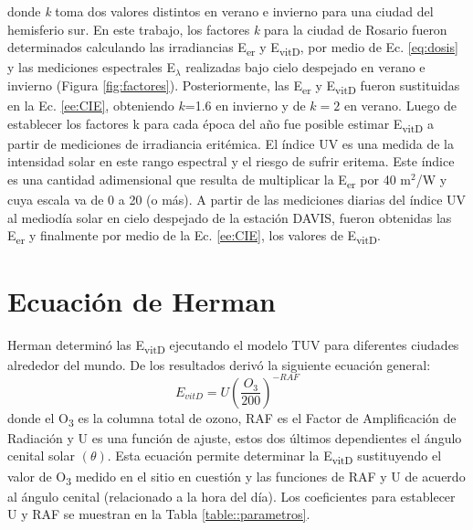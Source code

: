 \documentclass[10pt,twocolumn]{article}
\begin{document}
donde \emph{k} toma dos valores distintos en verano e invierno para una ciudad del hemisferio sur. En este trabajo, los factores \emph{k} para la ciudad de Rosario fueron determinados calculando las irradiancias E\textsubscript{er} y E\textsubscript{vitD}, por medio de Ec. \ref{eq:dosis} y las mediciones espectrales E$_\lambda$ realizadas bajo cielo despejado en verano e invierno (Figura \ref{fig:factores}). Posteriormente, las E\textsubscript{er} y E\textsubscript{vitD} fueron sustituidas en la Ec. \ref{ee:CIE}, obteniendo $k$=1.6 en invierno y de $k=2$ en verano. Luego de establecer los factores k para cada época del año fue posible estimar E\textsubscript{vitD} a partir de mediciones de irradiancia eritémica. El índice UV es una medida de la intensidad solar en este rango espectral y el riesgo de sufrir eritema. Este índice es una cantidad adimensional que resulta de multiplicar la E\textsubscript{er} por 40 m$^2$/W y cuya escala va de 0 a 20 (o más). A partir de las mediciones diarias del índice UV al mediodía solar en cielo despejado de la estación DAVIS, fueron obtenidas las E\textsubscript{er} y finalmente por medio de la Ec. \ref{ee:CIE}, los valores de E\textsubscript{vitD}.

\section{Ecuación de Herman}
Herman\cite{Herman2010} determinó las E\textsubscript{vitD} ejecutando el modelo TUV para diferentes ciudades alrededor del mundo. De los resultados derivó la siguiente ecuación general:
\begin{equation}
  E_{vitD}=U\left(\frac{O_3}{200}\right)^{-RAF}
  \label{eq:evitd}
\end{equation}
donde el O\textsubscript{3} es la columna total de ozono, RAF es el Factor de Amplificación de Radiación y U es una función de ajuste, estos dos últimos dependientes el ángulo cenital solar $(\theta)$. Esta ecuación permite determinar la E\textsubscript{vitD} sustituyendo el valor de O\textsubscript{3} medido en el sitio en cuestión y las funciones de RAF y U de acuerdo al ángulo cenital (relacionado a la hora del día). Los coeficientes para establecer U y RAF se muestran en la Tabla \ref{table::parametros}.
\end{document}
